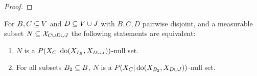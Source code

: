 \begin{proof}
\end{proof}
\begin{Lem}\label{lem:int-null-set-alt}
  For $B,C \subseteq V$ and $D \subseteq V \cup J$ with $B,C,D$ pairwise disjoint, and a measurable  subset $N \subseteq \mathcal{X}_{C \cup D \cup J}$ the following statements are equivalent:
    \begin{enumerate}
        \item $N$ is a $P(X_C|\operatorname{do}(X_{I_B},X_{D\cup J}))$-null set.
        \item For all subsets $B_2 \subseteq B$, $N$ is a $P(X_C|\operatorname{do}(X_{B_2},X_{D\cup J}))$-null set.
    \end{enumerate}
\end{Lem}
